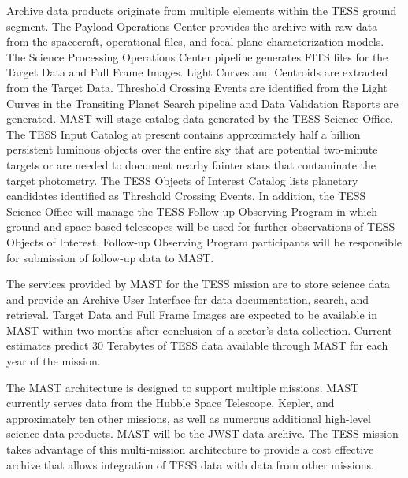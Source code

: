 \documentclass{report}
\begin{document}
Archive data products originate from multiple elements within the TESS ground segment.  The Payload Operations Center provides the archive with raw data from the spacecraft, operational files, and focal plane characterization models.  The Science Processing Operations Center pipeline generates FITS files for the Target Data and Full Frame Images.  Light Curves and Centroids are extracted from the Target Data.  Threshold Crossing Events are identified from the Light Curves in the Transiting Planet Search pipeline and Data Validation Reports are generated.  MAST will stage catalog data generated by the TESS Science Office.  The TESS Input Catalog at present contains approximately half a billion persistent luminous objects over the entire sky that are potential two-minute targets or are needed to document nearby fainter stars that contaminate the target photometry.  The TESS Objects of Interest Catalog lists planetary candidates identified as Threshold Crossing Events.  In addition, the TESS Science Office will manage the TESS Follow-up Observing Program in which ground and space based telescopes will be used for further observations of TESS Objects of Interest.  Follow-up Observing Program participants will be responsible for submission of follow-up data to MAST. 

The services provided by MAST for the TESS mission are to store science data and provide an Archive User Interface for data documentation, search, and retrieval.   Target Data and Full Frame Images are expected to be available in MAST within two months after conclusion of a sector’s data collection.  Current estimates predict 30 Terabytes of TESS data available through MAST for each year of the mission.

The MAST architecture is designed to support multiple missions.  MAST currently serves data from the Hubble Space Telescope, Kepler, and approximately ten other missions, as well as numerous additional high-level science data products. MAST will be the JWST data archive.  The TESS mission takes advantage of this multi-mission architecture to provide a cost effective archive that allows integration of TESS data with data from other missions.\newline
\newpage
\end{document}
